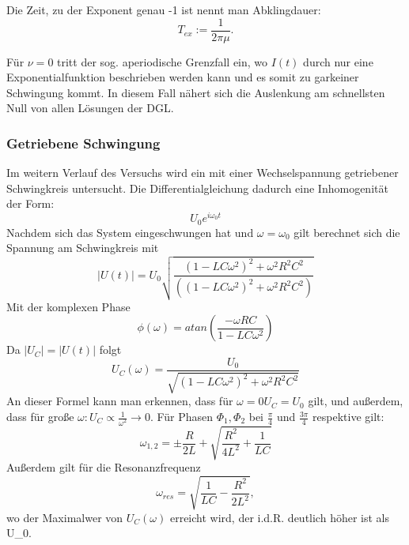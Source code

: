        Die Zeit, zu der Exponent genau -1 ist nennt man Abklingdauer:
       \begin{equation}
           \label{eqn:Abkling}
           T_{ex} := \frac{1}{2\pi\mu}.
       \end{equation}

       Für $\nu = 0$ tritt der sog. aperiodische Grenzfall ein,
       wo $I(t)$ durch nur eine Exponentialfunktion beschrieben werden kann und es somit zu garkeiner Schwingung kommt.
       In diesem Fall nähert sich die Auslenkung am schnellsten Null von allen Lösungen der DGL.

       \subsubsection{Getriebene Schwingung}
       \label{subs:Getriebene Schwingung}
       Im weitern Verlauf des Versuchs wird ein mit einer Wechselspannung getriebener Schwingkreis
       untersucht. Die Differentialgleichung dadurch eine Inhomogenität der Form:
       \begin{equation*}
           U_0e^{i\omega_0 t}
       \end{equation*}
       Nachdem sich das System eingeschwungen hat und $\omega = \omega_0$ gilt
       berechnet sich die Spannung am Schwingkreis mit
       \begin{equation}
           |U(t)| = U_0\sqrt{\frac{(1-LC\omega^2)^2+\omega^2R^2C^2}{((1-LC\omega^2)^2+\omega^2R^2C^2)}}
       \end{equation}
       Mit der komplexen Phase
       \begin{equation}
           \label{eqn:Phase}
           \phi(\omega) = atan\left(\frac{-\omega RC}{1-LC\omega^2}\right)
       \end{equation}
       Da $|U_C|=|U(t)|$ folgt
       \begin{equation}
           U_C(\omega)=\frac{U_0}{\sqrt{(1-LC\omega^2)^2+\omega^2R^2C^2}}
       \end{equation}
       An dieser Formel kann man erkennen, dass für $\omega = 0 U_C = U_0$ gilt,
       und außerdem, dass für große $\omega : U_C \propto \frac{1}{\omega^2} \rightarrow 0.$
       Für Phasen $\Phi_1,\Phi_2$ bei  $\frac{\pi}{4}$ und $\frac{3\pi}{4}$ respektive
       gilt:
       \begin{equation}
           \label{eqn:Spektrum}
           \omega_{1,2}=\pm \frac{R}{2L}+\sqrt{\frac{R^2}{4L^2}+\frac{1}{LC}}
       \end{equation}
       Außerdem gilt für die Resonanzfrequenz
       \begin{equation}
           \label{eqn:ResFrequenz}
           \omega_{res} = \sqrt{\frac{1}{LC}-\frac{R^2}{2L^2}},
       \end{equation}
       wo der Maximalwer von $U_C(\omega)$ erreicht wird, der i.d.R. deutlich höher ist als U_0.

